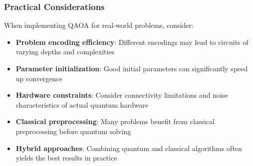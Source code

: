 \vspace{0.3cm}

\subsubsection*{Practical Considerations}

When implementing QAOA for real-world problems, consider:

\begin{itemize}
  \item \textbf{Problem encoding efficiency}: Different encodings may lead to
    circuits of varying depths and complexities

  \item \textbf{Parameter initialization}: Good initial parameters can
    significantly speed up convergence

  \item \textbf{Hardware constraints}: Consider connectivity limitations and
    noise characteristics of actual quantum hardware

  \item \textbf{Classical preprocessing}: Many problems benefit from
    classical preprocessing before quantum solving

  \item \textbf{Hybrid approaches}: Combining quantum and classical
    algorithms often yields the best results in practice
\end{itemize}
